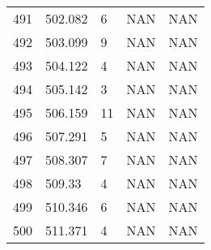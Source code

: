 \documentclass{article}
\begin{document}
\begin{longtable}{@{}lllll@{}}
				491 & 502.082 & 6     & NAN   & NAN   \\
				492 & 503.099 & 9     & NAN   & NAN   \\
				493 & 504.122 & 4     & NAN   & NAN   \\
				494 & 505.142 & 3     & NAN   & NAN   \\
				495 & 506.159 & 11    & NAN   & NAN   \\
				496 & 507.291 & 5     & NAN   & NAN   \\
				497 & 508.307 & 7     & NAN   & NAN   \\
				498 & 509.33  & 4     & NAN   & NAN   \\
				499 & 510.346 & 6     & NAN   & NAN   \\
				500 & 511.371 & 4     & NAN   & NAN   \\* \bottomrule
			\end{longtable}
			\newpage
			
\end{document}

